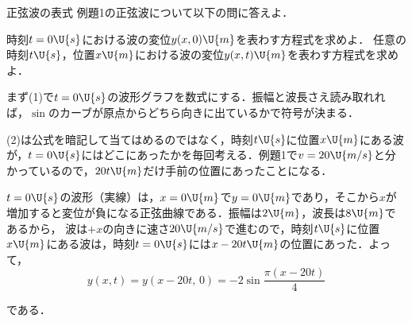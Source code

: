 \bsNeed{42mm}
\begin{reidaiunit}
\begin{reidai}{正弦波の表式}
\hspace{1zw}例題1の正弦波について以下の問に答えよ．
\begin{komon}
 時刻$t=0\U{s}$における波の変位$y(x,0)\U{m}$を表わす方程式を求めよ．
 任意の時刻$t\U{s}$，位置$x\U{m}$における波の変位$y(x,t)\U{m}$を表わす方程式を求めよ．
\end{komon}
\end{reidai}

\begin{sisinE}
まず(1)で$t=0\U{s}$の波形グラフを数式にする．振幅と波長さえ読み取れれば，$\sin$のカーブが原点からどちら向きに出ているかで符号が決まる．

(2)は公式を暗記して当てはめるのではなく，{\gtfamily 時刻$t\U{s}$に位置$x\U{m}$にある波が，$t=0\U{s}$にはどこにあったか}を毎回考える．例題1で$v=20\U{m/s}$と分かっているので，$20t\U{m}$だけ手前の位置にあったことになる．
\end{sisinE}

\begin{kaitou}
\begin{komon}
 $t=0\U{s}$の波形（実線）は，$x=0\U{m}$で$y=0\U{m}$であり，そこから$x$が増加すると変位が負になる正弦曲線である．振幅は$2\U{m}$，波長は$8\U{m}$であるから，
 波は$+x$の向きに速さ$20\U{m/s}$で進むので，時刻$t\U{s}$に位置$x\U{m}$にある波は，時刻$t=0\U{s}$には$x-20t\U{m}$の位置にあった．よって，
       \[y(x,t)=y(x-20t,\,0)=-2\sin\frac{\pi(x-20t)}{4}\]
\end{komon}
\end{kaitou}
\end{reidaiunit}

である．


